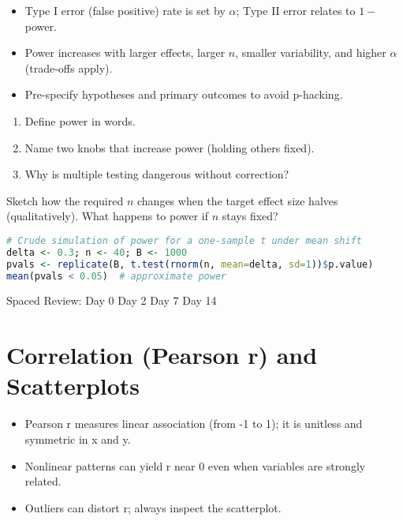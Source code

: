 \documentclass[11pt,a4paper]{article}
\def\textbf#1{#1}%
\newcommand{\reviewticks}{
  \vspace{0.4em}
  \noindent\scriptsize\textbf{Spaced Review:}
  \fbox{\phantom{D0}} Day 0\quad
  \fbox{\phantom{D2}} Day 2\quad
  \fbox{\phantom{D7}} Day 7\quad
  \fbox{\phantom{D14}} Day 14
}
\begin{document}
\begin{corebox}
\begin{itemize}
  \item Type I error (false positive) rate is set by \(\alpha\); Type II error relates to \(1 - \)power.
  \item Power increases with larger effects, larger \(n\), smaller variability, and higher \(\alpha\) (trade-offs apply).
  \item Pre-specify hypotheses and primary outcomes to avoid p-hacking.
\end{itemize}
\end{corebox}

\begin{recallbox}
\begin{enumerate}
  \item Define power in words.
  \item Name two knobs that increase power (holding others fixed).
  \item Why is multiple testing dangerous without correction?
\end{enumerate}
\end{recallbox}

\begin{practicebox}
Sketch how the required \(n\) changes when the target effect size halves (qualitatively). What happens to power if \(n\) stays fixed?
\end{practicebox}

\begin{rbox}
\begin{lstlisting}[language=R]
# Crude simulation of power for a one-sample t under mean shift
delta <- 0.3; n <- 40; B <- 1000
pvals <- replicate(B, t.test(rnorm(n, mean=delta, sd=1))$p.value)
mean(pvals < 0.05)  # approximate power
\end{lstlisting}
\end{rbox}

\reviewticks

\section{Correlation (Pearson r) and Scatterplots}

\begin{corebox}
\begin{itemize}
  \item Pearson r measures linear association (from -1 to 1); it is unitless and symmetric in x and y.
  \item Nonlinear patterns can yield r near 0 even when variables are strongly related.
  \item Outliers can distort r; always inspect the scatterplot.
\end{itemize}
\end{corebox}
\end{document}

